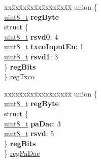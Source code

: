 \begin{DoxyCompactItemize}
\begin{tabbing}
\end{tabbing}\item 
\begin{tabbing}
xx\=xx\=xx\=xx\=xx\=xx\=xx\=xx\=xx\=\kill
union \{\\
\>\hyperlink{vl53l0x__types_8h_aba7bc1797add20fe3efdf37ced1182c5}{uint8\_t} {\bfseries regByte}\\
\>struct \{\\
\>\>\hyperlink{vl53l0x__types_8h_aba7bc1797add20fe3efdf37ced1182c5}{uint8\_t} {\bfseries rsvd0}: 4\\
\>\>\hyperlink{vl53l0x__types_8h_aba7bc1797add20fe3efdf37ced1182c5}{uint8\_t} {\bfseries txcoInputEn}: 1\\
\>\>\hyperlink{vl53l0x__types_8h_aba7bc1797add20fe3efdf37ced1182c5}{uint8\_t} {\bfseries rsvd1}: 3\\
\>\} {\bfseries regBits}\\
\} \hyperlink{structFSK__Register__Map_a8f7cbdb8a9512fe413105c1a653b8605}{regTxco}\\

\end{tabbing}\item 
\begin{tabbing}
xx\=xx\=xx\=xx\=xx\=xx\=xx\=xx\=xx\=\kill
union \{\\
\>\hyperlink{vl53l0x__types_8h_aba7bc1797add20fe3efdf37ced1182c5}{uint8\_t} {\bfseries regByte}\\
\>struct \{\\
\>\>\hyperlink{vl53l0x__types_8h_aba7bc1797add20fe3efdf37ced1182c5}{uint8\_t} {\bfseries paDac}: 3\\
\>\>\hyperlink{vl53l0x__types_8h_aba7bc1797add20fe3efdf37ced1182c5}{uint8\_t} {\bfseries rsvd}: 5\\
\>\} {\bfseries regBits}\\
\} \hyperlink{structFSK__Register__Map_ac0786829a2532811435e09eb8b62e1bf}{regPaDac}\\


\end{tabbing}
\end{DoxyCompactItemize}
